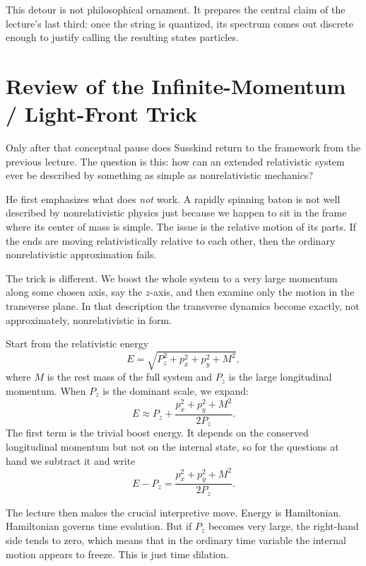 This detour is not philosophical ornament. It prepares the central claim of the lecture's last third: once the string is quantized, its spectrum comes out discrete enough to justify calling the resulting states particles.

\section{Review of the Infinite-Momentum / Light-Front Trick}

Only after that conceptual pause does Susskind return to the framework from the previous lecture. The question is this: how can an extended relativistic system ever be described by something as simple as nonrelativistic mechanics?

He first emphasizes what does \emph{not} work. A rapidly spinning baton is not well described by nonrelativistic physics just because we happen to sit in the frame where its center of mass is simple. The issue is the relative motion of its parts. If the ends are moving relativistically relative to each other, then the ordinary nonrelativistic approximation fails.

The trick is different. We boost the whole system to a very large momentum along some chosen axis, say the \(z\)-axis, and then examine only the motion in the transverse plane. In that description the transverse dynamics become exactly, not approximately, nonrelativistic in form.

Start from the relativistic energy
\begin{equation}
E=\sqrt{P_z^2+p_x^2+p_y^2+M^2},
\end{equation}
where \(M\) is the rest mass of the full system and \(P_z\) is the large longitudinal momentum. When \(P_z\) is the dominant scale, we expand:
\begin{equation}
E \approx P_z+\frac{p_x^2+p_y^2+M^2}{2P_z}.
\end{equation}
The first term is the trivial boost energy. It depends on the conserved longitudinal momentum but not on the internal state, so for the questions at hand we subtract it and write
\begin{equation}
E-P_z=\frac{p_x^2+p_y^2+M^2}{2P_z}.
\end{equation}

The lecture then makes the crucial interpretive move. Energy is Hamiltonian. Hamiltonian governs time evolution. But if \(P_z\) becomes very large, the right-hand side tends to zero, which means that in the ordinary time variable the internal motion appears to freeze. This is just time dilation.

